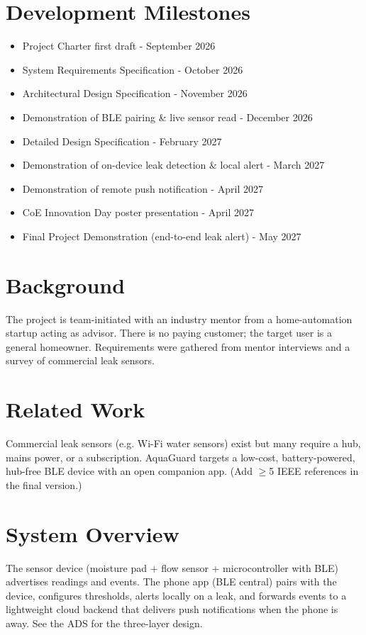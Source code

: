 \documentclass[11pt,letterpaper]{article}
\begin{document}
\section{Development Milestones}
\begin{itemize}
  \item Project Charter first draft - September 2026
  \item System Requirements Specification - October 2026
  \item Architectural Design Specification - November 2026
  \item Demonstration of BLE pairing \& live sensor read - December 2026
  \item Detailed Design Specification - February 2027
  \item Demonstration of on-device leak detection \& local alert - March 2027
  \item Demonstration of remote push notification - April 2027
  \item CoE Innovation Day poster presentation - April 2027
  \item Final Project Demonstration (end-to-end leak alert) - May 2027
\end{itemize}
\newpage

\section{Background}
The project is team-initiated with an industry mentor from a home-automation startup
acting as advisor. There is no paying customer; the target user is a general
homeowner. Requirements were gathered from mentor interviews and a survey of
commercial leak sensors.

\section{Related Work}
Commercial leak sensors (e.g. Wi-Fi water sensors) exist \cite{Rubin2012} but many
require a hub, mains power, or a subscription. AquaGuard targets a low-cost,
battery-powered, hub-free BLE device with an open companion app. (Add $\geq$5 IEEE
references in the final version.)

\section{System Overview}
The sensor device (moisture pad + flow sensor + microcontroller with BLE) advertises
readings and events. The phone app (BLE central) pairs with the device, configures
thresholds, alerts locally on a leak, and forwards events to a lightweight cloud
backend that delivers push notifications when the phone is away. See the ADS for the
three-layer design.
\end{document}

